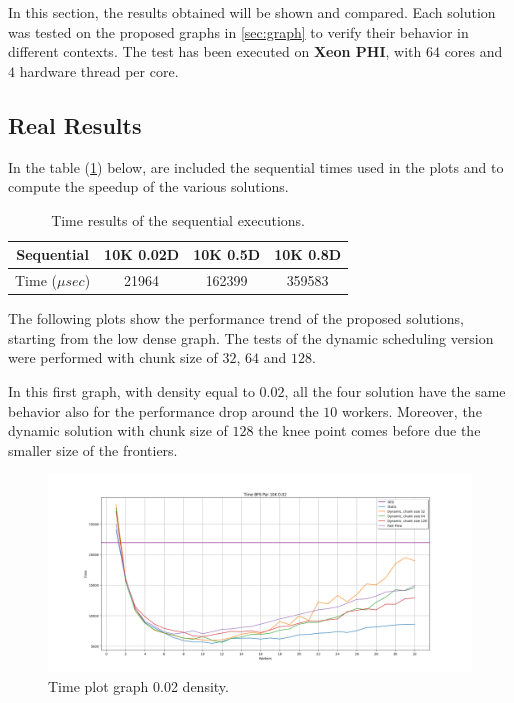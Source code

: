 In this section, the results obtained will be shown and compared. Each solution was tested on the proposed graphs in \ref{sec:graph} to verify their behavior in different contexts. 
The test has been executed on \textbf{Xeon PHI}, with $64$ cores and $4$ hardware thread per core. 

\subsection{Real Results}
In the table (\ref{table:seq_times}) below, are included the sequential times used in the plots and to compute the speedup of the various solutions.
\begin{table}[htb!]
\centering
\begin{tabular}{|c|c|c|c|}
\hline
Sequential & 10K 0.02D & 10K 0.5D & 10K 0.8D \\ \hline
Time ($\mu sec$)          & 21964     & 162399   & 359583   \\ \hline
\end{tabular}
\caption{Time results of the sequential executions.}
\label{table:seq_times}
\end{table}
\FloatBarrier

The following plots show the performance trend of the proposed solutions, starting from the low dense graph. The tests of the dynamic scheduling version were performed with chunk size of $32$, $64$ and $128$. 

In this first graph, with density equal to $0.02$, all the four solution have the same behavior also for the performance drop around the $10$ workers. Moreover, the dynamic solution with chunk size of $128$ the knee point comes before due the smaller size of the frontiers.
\begin{figure}[htb!]
    \centering
    \includegraphics[width=\textwidth]{Figures/plot_map_time_vs10K002.png}
    \caption{Time plot graph 0.02 density.}
    \label{fig:plot_time_10k_002}
\end{figure}
\FloatBarrier

